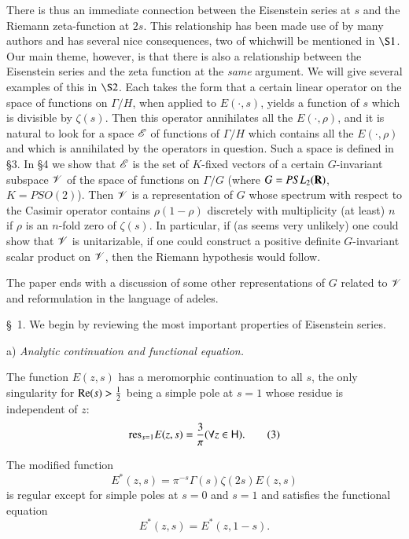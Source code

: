 There is thus an immediate connection between the Eisenstein series at $s$ and the Riemann zeta-function at $2s$. This relationship has been made use of by many authors and has several nice consequences, two of which\pageoriginale will be mentioned in $\S 1$. Our main theme, however, is that there is also a relationship between the Eisenstein series and the zeta function at the \textit{same} argument. We will give several examples of this in $\S 2$. Each takes the form that a certain linear operator on the space of functions on $\Gamma/H$, when applied to $E(\cdot, s)$, yields a function of $s$ which is divisible by $\zeta(s)$. Then this operator annihilates all the $E (\cdot, \rho)$, and it is natural to look for a space $\mathscr{E}$ of functions of $\Gamma / H$ which contains all the $E(\cdot, \rho)$ and which is annihilated by the operators in question. Such a space is defined in \S 3. In \S 4 we show that $\mathscr{E}$ is the set of $K$-fixed vectors of a certain $G$-invariant subspace $\mathscr{V}$ of the space of functions on $\Gamma / G$ (where $G = PSL_2 (\mathbf{R})$, $K = PSO(2)$). Then $\mathscr{V}$ is a representation of $G$ whose spectrum with respect to the Casimir operator contains $\rho (1-\rho)$  discretely with multiplicity (at least) $n$ if $\rho$ is an $n$-fold zero of $\zeta(s)$. In particular, if (as seems very unlikely) one could show that $\mathscr{V}$ is unitarizable, \ie if one could construct a positive definite $G$-invariant scalar product on $\mathscr{V}$, then the Riemann hypothesis would follow.

The paper ends with a discussion of some other representations of $G$ related to $\mathscr{V}$ and reformulation in the language of adeles. 

\smallskip
\S~1. We begin by reviewing the most important properties of Eisenstein series. 

a) \textit{Analytic continuation and functional equation.}

The function $E(z,s)$ has a meromorphic continuation to all $s$, the only singularity for $\operatorname{Re} (s) > \frac{1}{2}$ being a simple pole at $s =1$ whose residue is independent of $z$:
\begin{equation*}
\mathrm{res}_{s=1} E(z,s) = \frac{3}{\pi} (\forall z \in \mathsf{H}). \tag{3}\label{art10-eq3}
\end{equation*}

The modified function
\begin{equation*}
E^\ast (z,s) = \pi^{-s} \Gamma (s) \zeta(2s) E (z,s) \tag{4}\label{art10-eq4} 
\end{equation*}
is regular except for simple poles at $s =0$ and $s =1$ and satisfies the functional equation 
\begin{equation*}
E^{\ast} (z,s) = E^\ast (z, 1 - s). \tag{5}\label{art10-eq5}
\end{equation*}

